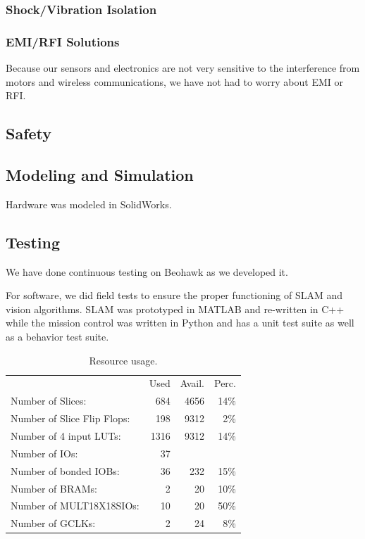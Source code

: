 \documentclass[12pt, letterpaper]{article}
\begin{document}
\subsubsection{Shock/Vibration Isolation}

\subsubsection{EMI/RFI Solutions}
Because our sensors and electronics are not very sensitive to the interference from motors and wireless communications, we have not had to worry about EMI or RFI.

\subsection{Safety}

\subsection{Modeling and Simulation}
Hardware was modeled in SolidWorks.

\subsection{Testing}
We have done continuous testing on Beohawk as we developed it. 

For software, we did field tests to ensure the proper functioning of SLAM and vision algorithms.  SLAM was prototyped in MATLAB and re-written in C++ while the mission control was written in Python and has a unit test suite as well as a behavior test suite. 

\begin{table}[h]
\centering
\begin{tabular}{l  r  r  r}
                                       & Used  & Avail. & Perc. \\
  Number of Slices:                    &  684  & 4656  &  14\%  \\
  Number of Slice Flip Flops:          &  198  & 9312  &   2\%  \\
  Number of 4 input LUTs:              & 1316  & 9312  &  14\%  \\
  Number of IOs:                       &   37  &       &      \\
  Number of bonded IOBs:               &   36  &  232  &  15\%  \\
  Number of BRAMs:                     &    2  &   20  &  10\%  \\
  Number of MULT18X18SIOs:             &   10  &   20  &  50\%  \\
  Number of GCLKs:                     &    2  &   24  &   8\%  \\
\end{tabular}
\caption{Resource usage.}
\label{tab:usage}
\end{table}
\end{document}
